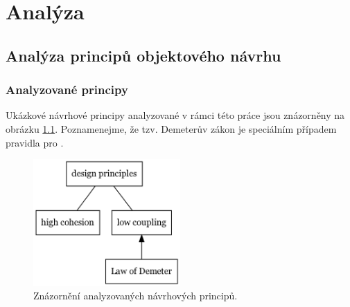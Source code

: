\chapter{Analýza}



\section{Analýza principů objektového návrhu}


\subsection{Analyzované principy}
Ukázkové návrhové principy analyzované v rámci této práce jsou znázorněny na obrázku \ref{analyzed_principles}. Poznamenejme, že tzv. Demeterův zákon je speciálním případem pravidla pro .

\begin{figure}[h!]
  \centering
  \includegraphics[width=0.5\textwidth]{./graphs/oop_design_principles.png}
  \caption{Znázornění analyzovaných návrhových principů.\label{analyzed_principles}}
\end{figure}



